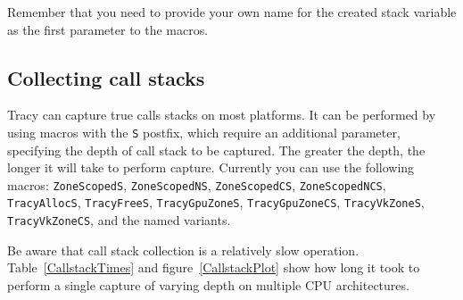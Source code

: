 \documentclass[hidelinks,titlepage,a4paper]{article}
\begin{document}
Remember that you need to provide your own name for the created stack variable as the first parameter to the macros.

\subsection{Collecting call stacks}
\label{collectingcallstacks}

Tracy can capture true calls stacks on most platforms. It can be performed by using macros with the \texttt{S} postfix, which require an additional parameter, specifying the depth of call stack to be captured. The greater the depth, the longer it will take to perform capture. Currently you can use the following macros: \texttt{ZoneScopedS}, \texttt{ZoneScopedNS}, \texttt{ZoneScopedCS}, \texttt{ZoneScopedNCS}, \texttt{TracyAllocS}, \texttt{TracyFreeS}, \texttt{TracyGpuZoneS}, \texttt{TracyGpuZoneCS}, \texttt{TracyVkZoneS}, \texttt{TracyVkZoneCS}, and the named variants.

Be aware that call stack collection is a relatively slow operation. Table~\ref{CallstackTimes} and figure~\ref{CallstackPlot} show how long it took to perform a single capture of varying depth on multiple CPU architectures.
\end{document}
